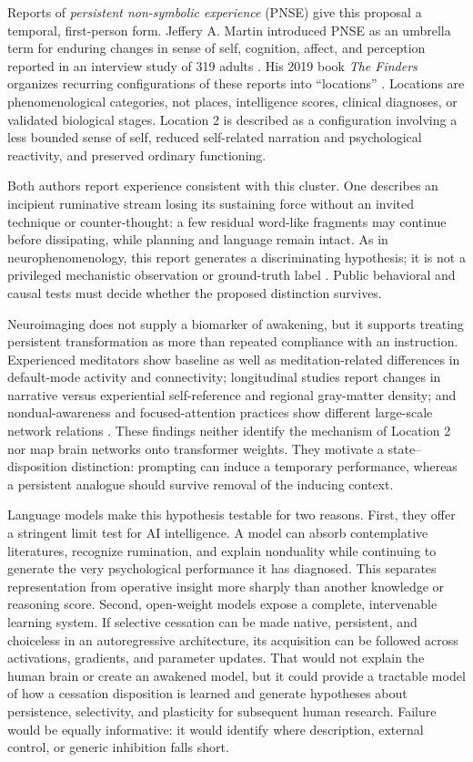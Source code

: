 \documentclass[10pt,twocolumn]{article}
\begin{document}
Reports of \emph{persistent non-symbolic experience} (PNSE) give this proposal a
temporal, first-person form. Jeffery A. Martin introduced PNSE as an umbrella term
for enduring changes in sense of self, cognition, affect, and perception reported
in an interview study of 319 adults \citep{martin2020pnse}. His 2019 book
\emph{The Finders} organizes
recurring configurations of these reports into ``locations''
\citep{martin2019finders}. Locations are phenomenological categories, not places,
intelligence scores, clinical diagnoses, or validated biological stages.
Location 2 is described as a configuration involving a less bounded sense of
self, reduced self-related narration and psychological reactivity, and preserved
ordinary functioning.

Both authors report experience consistent with this cluster. One describes an
incipient ruminative stream losing its sustaining force without an invited
technique or counter-thought: a few residual word-like fragments may continue
before dissipating, while planning and language remain intact. As in
neurophenomenology, this report generates a discriminating hypothesis; it is not
a privileged mechanistic observation or ground-truth label
\citep{varela1996neurophenomenology}. Public behavioral and causal tests must
decide whether the proposed distinction survives.

Neuroimaging does not supply a biomarker of awakening, but it supports treating
persistent transformation as more than repeated compliance with an instruction.
Experienced meditators show baseline as well as meditation-related differences in
default-mode activity and connectivity; longitudinal studies report changes in
narrative versus experiential self-reference and regional gray-matter density;
and nondual-awareness and focused-attention practices show different large-scale
network relations
\citep{brewer2011dmn,farb2007self,holzel2011gray,josipovic2012networks}. These
findings neither identify the mechanism of Location 2 nor map brain networks onto
transformer weights. They motivate a state--disposition distinction: prompting
can induce a temporary performance, whereas a persistent analogue should survive
removal of the inducing context.

Language models make this hypothesis testable for two reasons. First, they offer
a stringent limit test for AI intelligence. A model can absorb contemplative
literatures, recognize rumination, and explain nonduality while continuing to
generate the very psychological performance it has diagnosed. This separates
representation from operative insight more sharply than another knowledge or
reasoning score. Second, open-weight models expose a complete, intervenable
learning system. If selective cessation can be made native, persistent, and
choiceless in an autoregressive architecture, its acquisition can be followed
across activations, gradients, and parameter updates. That would not explain the
human brain or create an awakened model, but it could provide a tractable model
of how a cessation disposition is learned and generate hypotheses about
persistence, selectivity, and plasticity for subsequent human research. Failure
would be equally informative: it would identify where description, external
control, or generic inhibition falls short.
\end{document}
